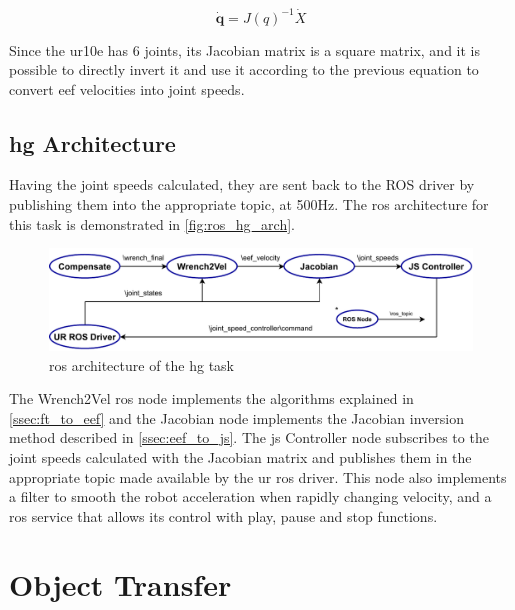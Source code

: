 \begin{equation}
    \dot{\mathbf{q}} = J(q)^{-1} \dot{X}
    \label{eq:inv_jacobian}
\end{equation}

\noindent Since the \ac{ur10e} has 6 joints, its Jacobian matrix is a square matrix, and it is possible to directly invert it and use it according to the previous equation to convert \ac{eef} velocities into joint speeds.



\subsection{\ac{hg} Architecture}

\par Having the joint speeds calculated, they are sent back to the ROS driver by publishing them into the appropriate topic, at 500Hz. The \ac{ros} architecture for this task is demonstrated in \autoref{fig:ros_hg_arch}.

\begin{figure}[h]
    \centering
    \includegraphics[width=\linewidth]{figs/chp5/ros_hg_arch.pdf}
    \caption{\ac{ros} architecture of the \ac{hg} task}
    \label{fig:ros_hg_arch}
\end{figure}

\par The Wrench2Vel \ac{ros} node implements the algorithms explained in \autoref{ssec:ft_to_eef} and the Jacobian node implements the Jacobian inversion method described in \autoref{ssec:eef_to_js}. The \ac{js} Controller node subscribes to the joint speeds calculated with the Jacobian matrix and publishes them in the appropriate topic made available by the \ac{ur} \ac{ros} driver. This node also implements a filter to smooth the robot acceleration when rapidly changing velocity, and a \ac{ros} service that allows its control with play, pause and stop functions.





\section{Object Transfer}

